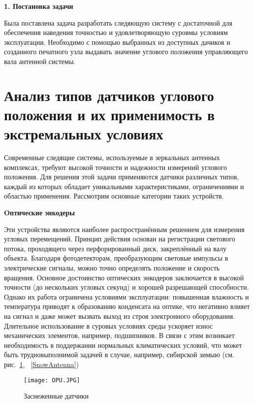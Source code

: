 \newpage
\begin{center}
  \textbf{\large 1. Постановка задачи}
\end{center}

Была поставлена задача разработать следяющую систему с достаточной для обеспечения наведения точностью и удовлетворяющую суровмы условиям эксплуатации.
Необходимо с помощью выбранных из доступных дачиков и созданного печатного узла выдавать значение углового положения управляющего вала антенной системы.

\section{Анализ типов датчиков углового положения и их применимость в экстремальных условиях}

Современные следящие системы, используемые в зеркальных антенных комплексах, требуют высокой точности и надежности измерений углового положения. 
Для решения этой задачи применяются датчики различных типов, каждый из которых обладает уникальными характеристиками, ограничениями и областью применения. 
Рассмотрим основные категории таких устройств.

\textbf{Oптические энкодеры} 
  
  Эти устройства являются наиболее распространённым решением для измерения угловых перемещений. Принцип действия основан на регистрации светового потока, проходящего через перфорированный диск, 
  закреплённый на валу объекта. Благодаря фотодетекторам, преобразующим световые импульсы в электрические сигналы, можно точно определять положение и скорость вращения.
  Основное достоинство оптических энкодеров заключается в высокой точности (до нескольких угловых секунд) и хорошей разрешающей способности. 
  Однако их работа ограничена условиями эксплуатации: повышенная влажность и температура приводят к образованию конденсата на оптике, 
  что негативно влияет на сигнал и даже может вызвать выход из строя электронного оборудования. 
  Длительное использование в суровых условиях среды ускоряет износ механических элементов, например, подшипников. В связи с этим возникает необходимость в поддержании нормальных климатических условий,
  что может быть трудновыполнимой задачей в случае, например, сибирской зимыю (см. рис.~\ref{OpuInSnow}, ~\ref{SnowAntenna})

  \begin{figure}[!t]
    \centering
    \texttt{[image: OPU.JPG]}
    \caption{Заснеженные датчики}
    \label{OpuInSnow}
  \end{figure}

